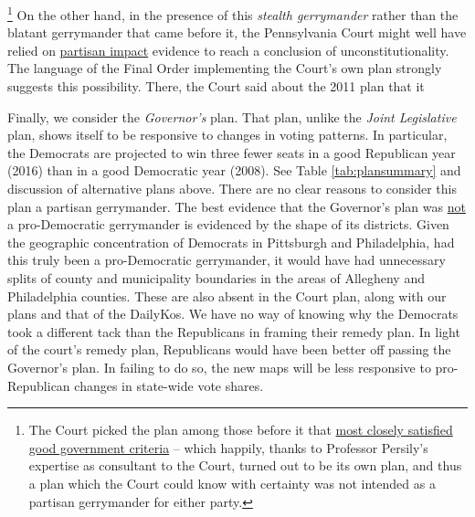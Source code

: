         \footnote{The Court picked the plan among those before it that \underline{most closely satisfied good government criteria} -- which happily, thanks to Professor Persily’s expertise as consultant to the Court, turned out to be its own plan, and thus a plan which the Court could know with certainty was not intended as a partisan gerrymander for either party.}
On the other hand, in the presence of this \textit{stealth gerrymander} rather than the blatant gerrymander that came before it, the Pennsylvania Court might well have relied on \underline{partisan impact} evidence to reach a conclusion of unconstitutionality. The language of the Final Order implementing the Court’s own plan strongly suggests this possibility. There, the Court said about the 2011 plan that it




\par
Finally, we consider the \textit{Governor’s} plan. That plan, unlike the \textit{Joint Legislative} plan, shows itself to be responsive to changes in voting patterns. In particular, the Democrats are projected to win three fewer seats in a good Republican year (2016) than in a good Democratic year (2008). See Table \ref{tab:plansummary} and discussion of alternative plans above. There are no clear reasons to consider this plan a partisan gerrymander. The best evidence that the Governor’s plan was \underline{not} a pro-Democratic gerrymander is evidenced by the shape of its districts.  Given the geographic concentration of Democrats in Pittsburgh and Philadelphia, had this truly been a pro-Democratic gerrymander, it would have had unnecessary splits of county and municipality boundaries in the areas of Allegheny and Philadelphia counties. These are also absent in the Court plan, along with our plans and that of the DailyKos. We have no way of knowing why the Democrats took a different tack than the Republicans in framing their remedy plan. In light of the court's remedy plan, Republicans would have been better off passing the Governor's plan. In failing to do so, the new maps will be less responsive to pro-Republican changes in state-wide vote shares.
%
%

